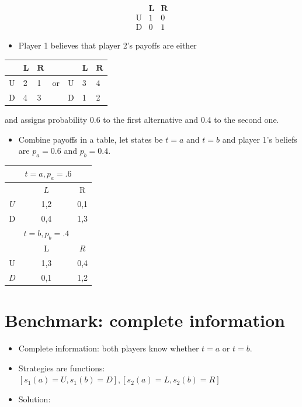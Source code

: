 \documentclass[10pt]{article}
\begin{document}
$$
\begin{array}{ccc} 
& \mathbf{L} & \mathbf{R} \\
\hline \mathrm{U} & 1 & 0 \\
\hline \mathrm{D} & 0 & 1
\end{array}
$$

\begin{itemize}
  \item Player 1 believes that player 2's payoffs are either
\end{itemize}

\begin{center}
\begin{tabular}{lllllll}
 & $\mathbf{L}$ & $\mathbf{R}$ &  &  & $\mathbf{L}$ & $\mathbf{R}$ \\
\hline
U & 2 & 1 & or & U & 3 & 4 \\
\hline
D & 4 & 3 &  & D & 1 & 2 \\
\hline
\end{tabular}
\end{center}

and assigns probability 0.6 to the first alternative and 0.4 to the second one.

\begin{itemize}
  \item Combine payoffs in a table, let states be $t=a$ and $t=b$ and player 1's beliefs are $p_{a}=0.6$ and $p_{b}=0.4$.
\end{itemize}

\begin{center}
\begin{tabular}{ccc}
\multicolumn{3}{c}{$t=a, p_{a}=.6$} \\
\hline
 & $L$ & R \\
\hline
$U$ & 1,2 & 0,1 \\
\hline
D & 0,4 & 1,3 \\
 & $t=b, p_{b}=.4$ &  \\
\hline
 & L & $R$ \\
\hline
U & 1,3 & 0,4 \\
\hline
$D$ & 0,1 & 1,2 \\
\hline
\end{tabular}
\end{center}

\section*{Benchmark: complete information}
\begin{itemize}
  \item Complete information: both players know whether $t=a$ or $t=b$.
  \item Strategies are functions:\\
$\left[s_{1}(a)=U, s_{1}(b)=D\right],\left[s_{2}(a)=L, s_{2}(b)=R\right]$
  \item Solution:
\end{itemize}
\end{document}
